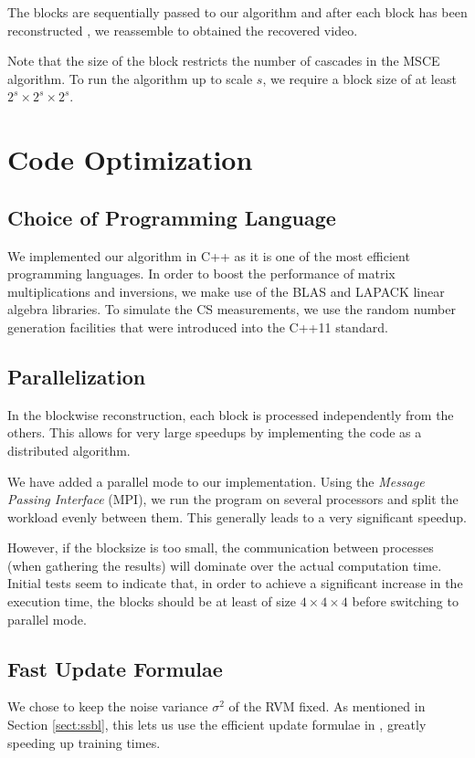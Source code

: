The blocks are sequentially passed to our algorithm and after each block has been reconstructed , we reassemble to obtained the recovered video.

Note that the size of the block restricts the number of cascades in the MSCE algorithm.
To run the algorithm up to scale $s$, we require a block size of at least $2^s\times 2^s\times 2^s$.

\section{Code Optimization}

\subsection{Choice of Programming Language}
We implemented our algorithm in C++ as it is one of the most efficient programming languages.
In order to boost the performance of matrix multiplications and inversions, we make use of the BLAS and LAPACK linear algebra libraries.
To simulate the CS measurements, we use the random number generation facilities that were introduced into the C++11 standard.

\subsection{Parallelization}
In the blockwise reconstruction, each block is processed independently from the others.
This allows for very large speedups by implementing the code as a distributed algorithm.

We have added a parallel mode to our implementation.
Using the \emph{Message Passing Interface} (MPI), we run the program on several processors and split the workload evenly between them.
This generally leads to a very significant speedup.

However, if the blocksize is too small, the communication between processes (when gathering the results) will dominate over the actual computation time.
Initial tests seem to indicate that, in order to achieve a significant increase in the execution time, the blocks should be at least of size $4\times4\times4$ before switching to parallel mode.


\subsection{Fast Update Formulae}
We chose to keep the noise variance $\sigma^2$ of the RVM fixed.
As mentioned in Section \ref{sect:ssbl}, this lets us use the efficient update formulae in \cite{tipping2003}, greatly speeding up training times.

